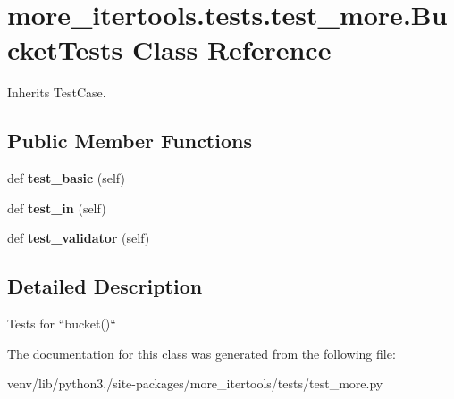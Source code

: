 \hypertarget{classmore__itertools_1_1tests_1_1test__more_1_1_bucket_tests}{}\section{more\+\_\+itertools.\+tests.\+test\+\_\+more.\+Bucket\+Tests Class Reference}
\label{classmore__itertools_1_1tests_1_1test__more_1_1_bucket_tests}


Inherits Test\+Case.

\subsection*{Public Member Functions}
\begin{DoxyCompactItemize}
\item 
\mbox{\label{classmore__itertools_1_1tests_1_1test__more_1_1_bucket_tests_a80784bf9acaa1298316ec5b6a2b43798}} 
def {\bfseries test\+\_\+basic} (self)
\item 
\mbox{\label{classmore__itertools_1_1tests_1_1test__more_1_1_bucket_tests_abf78cb0ea58c9a347100008026bfb7a4}} 
def {\bfseries test\+\_\+in} (self)
\item 
\mbox{\label{classmore__itertools_1_1tests_1_1test__more_1_1_bucket_tests_a2537c0853b5a51d3862c530a0b7c717c}} 
def {\bfseries test\+\_\+validator} (self)
\end{DoxyCompactItemize}


\subsection{Detailed Description}
\begin{DoxyVerb}Tests for ``bucket()``\end{DoxyVerb}
 

The documentation for this class was generated from the following file\+:\begin{DoxyCompactItemize}
\item 
venv/lib/python3./site-\/packages/more\+\_\+itertools/tests/test\+\_\+more.\+py\end{DoxyCompactItemize}
